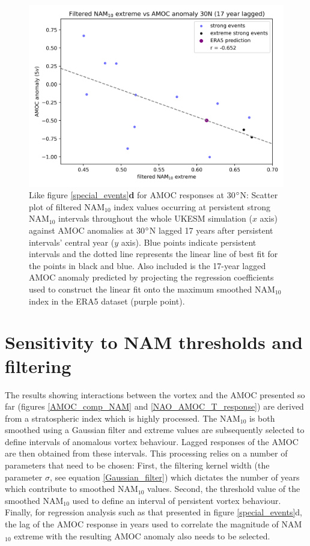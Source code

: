\newpage
\begin{figure}[h!]
\begin{center}
\noindent\includegraphics[width = 0.6\linewidth]{Figures/Figures-surface/AMOC_response_special_events_30N_AMOC.png} 
\caption[Regression of NAM$_{10}$ extreme magnitude vs AMOC anomaly at 30$\degree$N]{Like figure \ref{special_events}\textbf{d} for AMOC responses at 30$\degree$N: Scatter plot of filtered NAM$_{10}$ index values occurring at persistent strong NAM$_{10}$ intervals throughout the whole UKESM simulation ($x$ axis) against AMOC anomalies at 30$\degree$N lagged 17 years after persistent intervals' central year ($y$ axis). Blue points indicate persistent intervals and the dotted line represents the linear line of best fit for the points in black and blue. Also included is the 17-year lagged AMOC anomaly predicted by projecting the regression coefficients used to construct the linear fit onto the maximum smoothed NAM$_{10}$ index in the ERA5 dataset (purple point).}
\label{special_events_30}
\end{center}
\end{figure}

\section{Sensitivity to NAM thresholds and filtering}
\label{sec:sensitivity}

The results showing interactions between the vortex and the AMOC presented so far (figures \ref{AMOC_comp_NAM} and \ref{NAO_AMOC_T_response}) are derived from a stratospheric index which is highly processed. The NAM$_{10}$ is both smoothed using a Gaussian filter and extreme values are subsequently selected to define intervals of anomalous vortex behaviour. Lagged responses of the AMOC are then obtained from these intervals. This processing relies on a number of parameters that need to be chosen: First, the filtering kernel width (the parameter $\sigma$, see equation \ref{Gaussian_filter}) which dictates the number of years which contribute to smoothed NAM$_{10}$ values. Second, the threshold value of the smoothed NAM$_{10}$ used to define an interval of persistent vortex behaviour. Finally, for regression analysis such as that presented in figure \ref{special_events}d, the lag of the AMOC response in years used to correlate the magnitude of NAM$_{10}$ extreme with the resulting AMOC anomaly also needs to be selected. 

